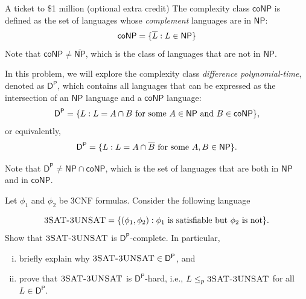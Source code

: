 \documentclass[12pt, letterpaper]{article}
\newcommand{\NP}{\mathsf{NP}}
\begin{document}
\newcommand{\DP}{\mathsf{D}^\mathsf{P}}
\newcommand{\coNP}{\mathsf{coNP}}
\begin{problem}{A ticket to \$1 million (optional extra credit)}
    The complexity class $\coNP$ is defined as the set of languages whose \emph{complement} languages are in $\NP$:
  \[
    \coNP = \set{\overline{L} : L\in\NP}
  \]
  Note that $\coNP \neq \overline{\NP}$, which is the class of languages that are not in $\NP$. 

In this problem, we will explore the complexity class \emph{difference polynomial-time}, denoted as $\DP$, which contains all languages that can be expressed as the intersection of an $\NP$ language and a $\coNP$ language:
  \[
    \DP = \set{L: \text{$L = A \cap B$ for some $A \in \NP$ and $B \in \coNP$}},
  \]
      or equivalently, 
      \[
        \DP = \set{L: \text{$L = A \cap \overline B$ for some $A,B \in \NP$}}.
      \]

  Note that $\DP \neq \NP \cap \coNP$, which is the set of languages that are both in $\NP$ and in $\coNP$.
\end{problem}
\newcommand{\TSTUS}{\textsc{3SAT-3UNSAT}}
\begin{subproblem}{}
    Let $\phi_1$ and $\phi_2$ be 3CNF formulas. Consider the following language
    
    \[
        \TSTUS = \set{(\phi_1, \phi_2): \text{$\phi_1$ is satisfiable but $\phi_2$ is not}}.
    \]
    Show that $\TSTUS$ is $\DP$-complete. In particular, 
      \begin{enumerate}[(i)]
          \item briefly explain why $\TSTUS \in \DP$, and
          \item prove that $\TSTUS$ is $\DP$-hard, i.e., $L \ptimemap \TSTUS$ for all $L \in \DP$.
        \end{enumerate}
\end{subproblem}
\end{document}
